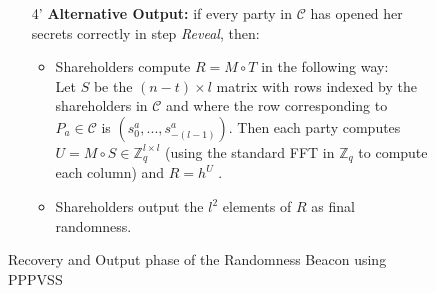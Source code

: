 \begin{figure}[ht]
\begin{tcolorbox}[title=\textbf{Randomness Beacon using PPPVSS (cont.)}, width=0.9\textwidth, colframe=blue!75!black, colback=blue!10, sharp corners]
\begin{enumerate}
            \item [4']\textbf{Alternative Output:}  if every party in $\mathcal{C}$ has opened her secrets correctly in step \textit{Reveal}, then:
            \begin{itemize}
                \item Shareholders compute $R = M \circ T$ in the following way:\\
                    Let $S$ be the $(n - t) \times l$ matrix with rows indexed by the shareholders in $\mathcal{C}$ and where the row
                    corresponding to $P_a \in\mathcal{C}$ is $(s_0^a,...,s_{-(l-1)}^a )$. Then each party computes $U = M \circ S \in\mathbb{Z}_q^{l\times l}$ (using the standard FFT in $\mathbb{Z}_q$ to compute each column) and $R = h^U$ .
                \item Shareholders output the $l^2$ elements of $R$ as final randomness.
            \end{itemize}
        \end{enumerate}
    \end{tcolorbox}
    \caption{Recovery and Output phase of the Randomness Beacon using PPPVSS}
    \label{fig:randomness_beacon_cont}
\end{figure}